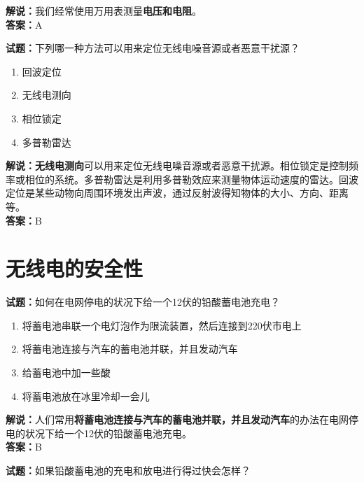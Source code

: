 \documentclass{ctexbook}
\begin{document}
\noindent\textbf{解说：}我们经常使用万用表测量\textbf{电压和电阻}。\\\noindent\textbf{答案：}A

\bigskip


\noindent\textbf{试题：}下列哪一种方法可以用来定位无线电噪音源或者恶意干扰源？

\begin{enumerate}[leftmargin=3em]
	\item 回波定位
	\item 无线电测向
	\item 相位锁定
	\item 多普勒雷达
\end{enumerate}

\noindent\textbf{解说：}\textbf{无线电测向}可以用来定位无线电噪音源或者恶意干扰源。相位锁定是控制频率或相位的系统。多普勒雷达是利用多普勒效应来测量物体运动速度的雷达。回波定位是某些动物向周围环境发出声波，通过反射波得知物体的大小、方向、距离等。\\
\noindent\textbf{答案：}B









\chapter{无线电的安全性}

\newpage

\noindent\textbf{试题：}如何在电网停电的状况下给一个12伏的铅酸蓄电池充电？

\begin{enumerate}[leftmargin=3em]
	\item 将蓄电池串联一个电灯泡作为限流装置，然后连接到220伏市电上
	\item 将蓄电池连接与汽车的蓄电池并联，并且发动汽车
	\item 给蓄电池中加一些酸
	\item 将蓄电池放在冰里冷却一会儿
\end{enumerate}

\noindent\textbf{解说：}人们常用\textbf{将蓄电池连接与汽车的蓄电池并联，并且发动汽车}的办法在电网停电的状况下给一个12伏的铅酸蓄电池充电。\\\noindent\textbf{答案：}B%

\bigskip


\noindent\textbf{试题：}如果铅酸蓄电池的充电和放电进行得过快会怎样？
\end{document}
